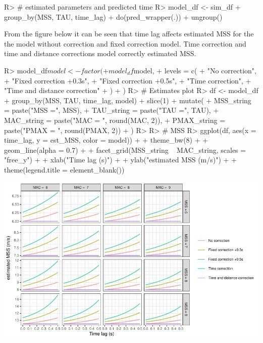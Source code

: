 \documentclass[
]{jss}
\begin{document}
\begin{CodeChunk}
\begin{CodeInput}
R> # estimated parameters and predicted time
R> model_df <- sim_df %
+   group_by(MSS, TAU, time_lag) %
+   do(pred_wrapper(.)) %
+   ungroup()
\end{CodeInput}
\end{CodeChunk}

From the figure below it can be seen that time lag affects estimated MSS for the the model without correction and fixed correction model. Time correction and time and distance corrections model correctly estimated MSS.

\begin{CodeChunk}
\begin{CodeInput}
R> model_df$model <- factor(
+   model_df$model,
+   levels = c(
+     "No correction",
+     "Fixed correction +0.3s",
+     "Fixed correction +0.5s",
+     "Time correction",
+     "Time and distance correction"
+   )
+ )
R> # Estimates plot
R> df <- model_df %
+   group_by(MSS, TAU, time_lag, model) %
+   slice(1) %
+   mutate(
+     MSS_string = paste("MSS =", MSS),
+     TAU_string = paste("TAU =", TAU),
+     MAC_string = paste("MAC = ", round(MAC, 2)),
+     PMAX_string = paste("PMAX = ", round(PMAX, 2))
+   )
R> 
R> # MSS
R> ggplot(df, aes(x = time_lag, y = est_MSS, color = model)) +
+   theme_bw(8) +
+   geom_line(alpha = 0.7) +
+   facet_grid(MSS_string ~ MAC_string, scales = "free_y") +
+   xlab("Time lag (s)") +
+   ylab("estimated MSS (m/s)") +
+   theme(legend.title = element_blank())
\end{CodeInput}


\begin{center}\includegraphics[width=1\linewidth]{paper_files/figure-latex/unnamed-chunk-43-1} \end{center}

\end{CodeChunk}
\end{document}
